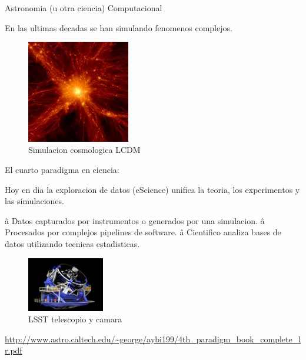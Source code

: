 \documentclass[ignorenonframetext,]{beamer}
\begin{document}
\begin{frame}{Astronomia (u otra ciencia) Computacional}

En las ultimas decadas se han simulando fenomenos complejos.

\begin{figure}
\centering
\includegraphics[width=0.40000\textwidth]{lcdm.jpeg}
\caption{Simulacion cosmologica LCDM}
\end{figure}

\end{frame}

\begin{frame}{El cuarto paradigma en ciencia:}

Hoy en dia la exploracion de datos (eScience) unifica la teoria, los
experimentos y las simulaciones.

â Datos capturados por instrumentos o generados por una simulacion.
â Procesados por complejos pipelines de software. â Cientifico
analiza bases de datos utilizando tecnicas estadisticas.

\begin{figure}
\centering
\includegraphics[width=0.30000\textwidth]{lsst.jpeg}
\caption{LSST telescopio y camara}
\end{figure}

\url{http://www.astro.caltech.edu/~george/aybi199/4th_paradigm_book_complete_lr.pdf}

\end{frame}
\end{document}
